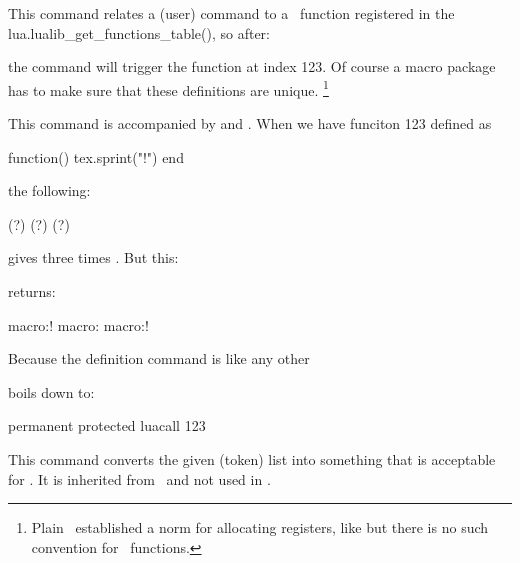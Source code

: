 
This command relates a (user) command to a \LUA\ function registered in the \typ
{lua.lualib_get_functions_table()}, so after:

\starttyping
\luadef{}
\stoptyping

the \type {\foo} command will trigger the function at index 123. Of course a
macro package has to make sure that these definitions are unique. \footnote
{Plain \TEX\ established a norm for allocating registers, like \typ {\newdimen}
but there is no such convention for \LUA\ functions.}

This command is accompanied by  and
. When we have funciton 123 defined as

\starttyping
function() tex.sprint("!") end
\stoptyping

the following:

\starttyping
(\luafunctioncall  \foocode ?)
(\normalluafunction\foocode ?)
(\foo                       ?)
\stoptyping

gives three times . But this:

\starttyping
\edef\oof{\foo                      } \meaning\oof  %
\edef\oof{\luafunctioncall  \foocode} \meaning\oof  %
\edef\oof{\normalluafunction\foocode} \meaning\oof  %
\stoptyping

returns:

\starttyping
macro:!
macro:
macro:!
\stoptyping

Because the definition command is like any other

\starttyping
\permanent\protected\luadef{}
\stoptyping

boils down to:

\starttyping
permanent protected luacall 123
\stoptyping

\stopnewprimitive

\startnewprimitive[title={\prm {luaescapestring}}]

This command converts the given (token) list into something that is acceptable
for \LUA. It is inherited from \LUATEX\ and not used in \CONTEXT.

\startbuffer
{}
\stopbuffer

\typebuffer

